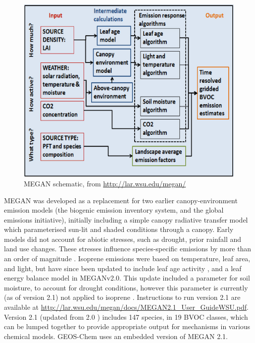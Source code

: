     \begin{figure}
      \includegraphics[width=\textwidth]{Figures/MEGANmodel_img.jpg}
      \caption{MEGAN schematic, from \url{http://lar.wsu.edu/megan/}}
      \label{Model:GC:Isop:MEGAN:fig_megan_schematic}
    \end{figure}
    
    MEGAN was developed as a replacement for two earlier canopy-environment emission models (the biogenic emission inventory system, and the global emissions initiative), initially including a simple canopy radiative transfer model which parameterised sun-lit and shaded conditions through a canopy.
    Early models did not account for abiotic stresses, such as drought, prior rainfall and land use changes. 
    These stresses influence species-specific emissions by more than an order of magnitude \parencite{Niinemets1999}.
    Isoprene emissions were based on temperature, leaf area, and light, but have since been updated to include leaf age activity \parencite{Guenther2000}, and a leaf energy balance model \parencite{Guenther2006} in MEGANv2.0.
    This update included a parameter for soil moisture, to account for drought conditions, however this parameter is currently (as of version 2.1) not applied to isoprene \parencite{Sindelarova2014}.
    Instructions to run version 2.1 are available at \url{http://lar.wsu.edu/megan/docs/MEGAN2.1_User_GuideWSU.pdf}.
    Version 2.1 (updated from 2.0 \parencite{Guenther2006}) includes 147 species, in 19 BVOC classes, which can be lumped together to provide appropriate output for mechanisms in various chemical models.
    GEOS-Chem uses an embedded version of MEGAN 2.1.
    
